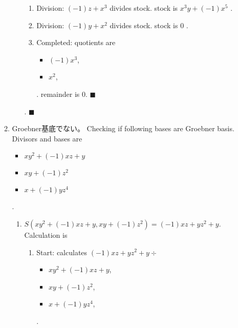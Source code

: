 \documentclass[9pt]{ltjsarticle}
\begin{document}
\begin{enumerate}[label=(問題 \arabic*)]
\begin{enumerate}[label=(\alph*)]
\begin{enumerate}
\begin{enumerate}
      \item Division: $(-1)z+x^{3}$ divides stock. stock is $x^{3}y+(-1)x^{5}$ .
      \item Division: $(-1)y+x^{2}$ divides stock. stock is $0$ .
      \item Completed: quotients are \begin{itemize}
      \item $(-1)x^{3}$,
      \item $x^{2}$,
      \end{itemize} .
      remainder is $0$.  $\blacksquare$
      \end{enumerate}
      .  $\blacksquare{}$\end{enumerate}
    \item
    Groebner基底でない。
    Checking if following bases are Groebner basis.
      Divisors and bases are
      \begin{itemize}
      \item $xy^{2}+(-1)xz+y$\item $xy+(-1)z^{2}$\item $x+(-1)yz^{4}$\end{itemize} .
      \begin{enumerate}
      \item $S(xy^{2}+(-1)xz+y, xy+(-1)z^{2}) = (-1)xz+yz^{2}+y$.  Calculation is \begin{enumerate}
      \item Start: calculates $(-1)xz+yz^{2}+y\div $\begin{itemize}
      \item $xy^{2}+(-1)xz+y$,
      \item $xy+(-1)z^{2}$,
      \item $x+(-1)yz^{4}$,
      \end{itemize} .


\end{enumerate}
\end{enumerate}
\end{enumerate}
\end{enumerate}
\end{document}
